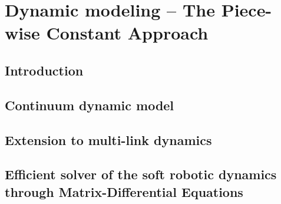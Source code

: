 \chapter[Dynamic modeling of Soft Robots -- PCC case]{Dynamic modeling -- The Piece-wise Constant Approach}
\label{chap: chapter 1}




\section{Introduction} \label{sec: chap1 1_introduction}


\newpage
\section{Continuum dynamic model}  \label{sec: chap2 section header}


\newpage
\section{Extension to multi-link dynamics}  \label{sec: chap2 section header}


\section{Efficient solver of the soft robotic dynamics through Matrix-Differential Equations}  \label{sec: chap2 section header}


